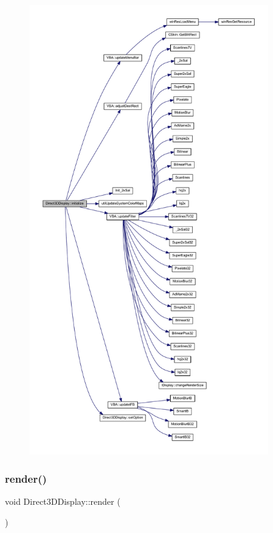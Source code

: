 \nopagebreak
\begin{figure}[H]
\begin{center}
\leavevmode
\includegraphics[height=550pt]{class_direct3_d_display_a8b8dfd84005816382396677e23d38879_cgraph}
\end{center}
\end{figure}
\mbox{\label{class_direct3_d_display_a1c789bf663cfd32bb2827b9a0f0429c7}} 
\subsubsection{\texorpdfstring{render()}{render()}}
{\footnotesize\ttfamily void Direct3\+D\+Display\+::render (\begin{DoxyParamCaption}{ }\end{DoxyParamCaption})\hspace{0.3cm}{\ttfamily [virtual]}}



